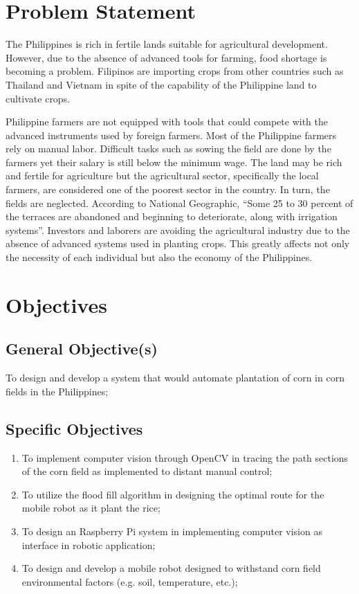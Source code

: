 \section{Problem Statement}
The Philippines is rich in fertile lands suitable for agricultural development. However, due to the absence of advanced tools for farming, food shortage is becoming a problem. Filipinos are importing crops from other countries such as Thailand and Vietnam in spite of the capability of the Philippine land to cultivate crops.
 
Philippine farmers are not equipped with tools that could compete with the advanced instruments used by foreign farmers. Most of the Philippine farmers rely on manual labor. Difficult tasks such as sowing the field are done by the farmers yet their salary is still below the minimum wage. The land may be rich and fertile for agriculture but the agricultural sector, specifically the local farmers, are considered one of the poorest sector in the country. In turn, the fields are neglected. According to National Geographic, “Some 25 to 30 percent of the terraces are abandoned and beginning to deteriorate, along with irrigation systems”. Investors and laborers are avoiding the agricultural industry due to the absence of advanced systems used in planting crops. This greatly affects not only the necessity of each individual but also the economy of the Philippines.
 
\section{Objectives}
\subsection{General Objective(s)}
To design and develop a system that would automate plantation of corn in corn fields in the Philippines;
 
\subsection{Specific Objectives}
 
\begin{enumerate}
\item To implement computer vision through OpenCV in tracing the path sections of the corn field as implemented to distant manual control;
 
\item To utilize the flood fill algorithm in designing the optimal route for the mobile robot as it plant the rice;
 
\item To design an Raspberry Pi system in implementing computer vision as interface in robotic application;
 
\item To design and develop a mobile robot designed to withstand corn field environmental factors (e.g. soil, temperature, etc.);
 
\end{enumerate}
 
